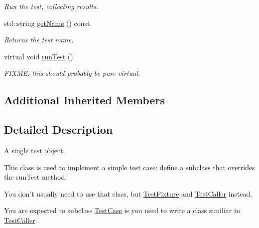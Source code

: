 \begin{DoxyCompactItemize}
\begin{DoxyCompactList}\small\item\em Run the test, collecting results. \end{DoxyCompactList}\item 
std\+::string \hyperlink{class_test_case_a833448555e5ce90d826f2b411f47ec3d}{get\+Name} () const 
\begin{DoxyCompactList}\small\item\em Returns the test name. \end{DoxyCompactList}\item 
\hypertarget{class_test_case_a6b55957ac1dfef01e5d9fa2475676f34}{virtual void \hyperlink{class_test_case_a6b55957ac1dfef01e5d9fa2475676f34}{run\+Test} ()}\label{class_test_case_a6b55957ac1dfef01e5d9fa2475676f34}

\begin{DoxyCompactList}\small\item\em F\+I\+X\+M\+E\+: this should probably be pure virtual. \end{DoxyCompactList}\end{DoxyCompactItemize}
\subsection*{Additional Inherited Members}


\subsection{Detailed Description}
A single test object. 

This class is used to implement a simple test case\+: define a subclass that overrides the run\+Test method.

You don't usually need to use that class, but \hyperlink{class_test_fixture}{Test\+Fixture} and \hyperlink{class_test_caller}{Test\+Caller} instead.

You are expected to subclass \hyperlink{class_test_case}{Test\+Case} is you need to write a class similiar to \hyperlink{class_test_caller}{Test\+Caller}. 

